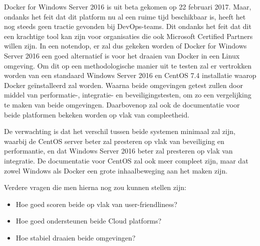Docker for Windows Server 2016 is uit beta gekomen op 22 februari 2017. Maar, ondanks het feit dat dit platform nu al een ruime tijd beschikbaar is, heeft het nog steeds geen tractie gevonden bij DevOps-teams. Dit ondanks het feit dat dit een krachtige tool kan zijn voor organisaties die ook Microsoft Certified Partners willen zijn. In een notendop, er zal dus gekeken worden of Docker for Windows Server 2016 een goed alternatief is voor het draaien van Docker in een Linux omgeving. Om dit op een methodologische manier uit te testen zal er vertrokken worden van een standaard Windows Server 2016 en CentOS 7.4 installatie waarop Docker geïnstalleerd zal worden. Waarna beide omgevingen getest zullen door middel van performatie-, integratie- en beveiligingstesten, om zo een vergelijking te maken van beide omgevingen. Daarbovenop zal ook de documentatie voor beide platformen bekeken worden op vlak van compleetheid.
\par
De verwachting is dat het verschil tussen beide systemen minimaal zal zijn, waarbij de CentOS server beter zal presteren op vlak van beveiliging en performantie, en dat Windows Server 2016 beter zal presteren op vlak van integratie. De documentatie voor CentOS zal ook meer compleet zijn, maar dat zowel Windows als Docker een grote inhaalbeweging aan het maken zijn.
\par
Verdere vragen die men hierna nog zou kunnen stellen zijn:
\begin{itemize}[noitemsep]
	\item Hoe goed scoren beide op vlak van user-friendliness?
	\item Hoe goed ondersteunen beide Cloud platforms?
	\item Hoe stabiel draaien beide omgevingen?
\end{itemize}